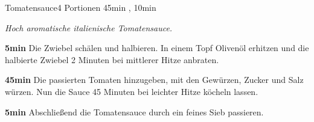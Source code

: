 \documentclass[../recipe-collections/cooking.tex]{subfiles}
\begin{document}
\begin{recipe}{Tomatensauce}{4 Portionen }{45min , 10min }

  \freeform{}\textit{Hoch aromatische italienische Tomatensauce.}


  \textbf{5min}
  Die Zwiebel schälen und halbieren.
  In einem Topf Olivenöl erhitzen und die halbierte Zwiebel 2 Minuten bei mittlerer Hitze anbraten.


  \textbf{45min}
  Die passierten Tomaten hinzugeben, mit den Gewürzen, Zucker und Salz würzen.
  Nun die Sauce 45 Minuten bei leichter Hitze köcheln lassen.

  \newstep{}\textbf{5min}
  Abschließend die Tomatensauce durch ein feines Sieb passieren.

  \freeform{}\hrulefill{}

\end{recipe}
\end{document}
